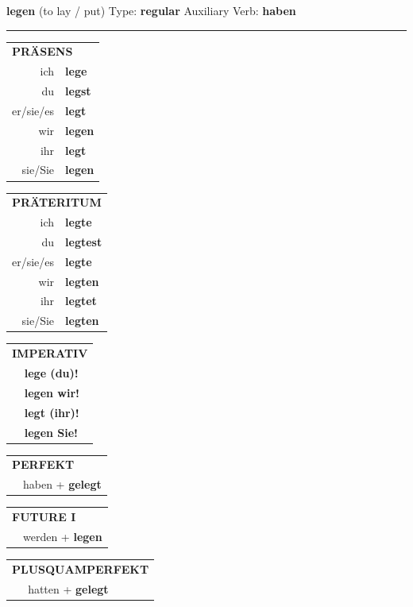 \documentclass[10pt,a4paper]{revtex4-2}
\begin{document}
\begin{verbbox}
{\Large \bf legen} (to lay / put) \hfill Type: \textbf{regular} \hfill Auxiliary Verb: \textbf{haben}

\vspace{5pt}
\hrule
\vspace{5pt}

\begin{tabular}{rl}
\multicolumn{2}{l}{\textbf{PRÄSENS}}\\
ich & \textbf{lege}\\
du & \textbf{legst}\\
er/sie/es & \textbf{legt}\\
wir & \textbf{legen}\\
ihr & \textbf{legt}\\
sie/Sie & \textbf{legen}\\
\end{tabular}
\hfill
\begin{tabular}{rl}
\multicolumn{2}{l}{\textbf{PRÄTERITUM}}\\
ich & \textbf{legte}\\
du & \textbf{legtest}\\
er/sie/es & \textbf{legte}\\
wir & \textbf{legten}\\
ihr & \textbf{legtet}\\
sie/Sie & \textbf{legten}\\
\end{tabular}
\hfill
\begin{tabular}{rl}
\multicolumn{2}{l}{\textbf{IMPERATIV}}\\
& \textbf{lege (du)!}\\
& \textbf{legen wir!}\\
& \textbf{legt (ihr)!}\\
& \textbf{legen Sie!}\\
\end{tabular}

\vspace{10pt}

\begin{tabular}{rl}
\multicolumn{2}{l}{\textbf{PERFEKT}}\\
& haben + \textbf{gelegt}\\
\end{tabular}
\hfill
\begin{tabular}{rl}
\multicolumn{2}{l}{\textbf{FUTURE I}}\\
& werden + \textbf{legen}\\
\end{tabular}
\hfill
\begin{tabular}{rl}
\multicolumn{2}{l}{\textbf{PLUSQUAMPERFEKT}}\\
& hatten + \textbf{gelegt}\\
\end{tabular}


\end{verbbox}
\end{document}
